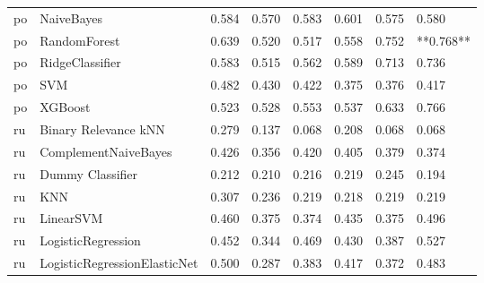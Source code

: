 \begin{tabular}{llllllll}
      po &                      NaiveBayes & 0.584 &                     0.570 &                 0.583 &                  0.601 &                                   0.575 &     0.580 \\
      po &                    RandomForest & 0.639 &                     0.520 &                 0.517 &                  0.558 &                                   0.752 & **0.768** \\
      po &                 RidgeClassifier & 0.583 &                     0.515 &                 0.562 &                  0.589 &                                   0.713 &     0.736 \\
      po &                             SVM & 0.482 &                     0.430 &                 0.422 &                  0.375 &                                   0.376 &     0.417 \\
      po &                         XGBoost & 0.523 &                     0.528 &                 0.553 &                  0.537 &                                   0.633 &     0.766 \\
      ru &            Binary Relevance kNN & 0.279 &                     0.137 &                 0.068 &                  0.208 &                                   0.068 &     0.068 \\
      ru &            ComplementNaiveBayes & 0.426 &                     0.356 &                 0.420 &                  0.405 &                                   0.379 &     0.374 \\
      ru &                Dummy Classifier & 0.212 &                     0.210 &                 0.216 &                  0.219 &                                   0.245 &     0.194 \\
      ru &                             KNN & 0.307 &                     0.236 &                 0.219 &                  0.218 &                                   0.219 &     0.219 \\
      ru &                       LinearSVM & 0.460 &                     0.375 &                 0.374 &                  0.435 &                                   0.375 &     0.496 \\
      ru &              LogisticRegression & 0.452 &                     0.344 &                 0.469 &                  0.430 &                                   0.387 &     0.527 \\
      ru &    LogisticRegressionElasticNet & 0.500 &                     0.287 &                 0.383 &                  0.417 &                                   0.372 &     0.483 \\

\end{tabular}
